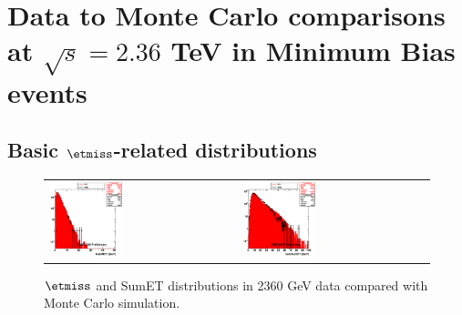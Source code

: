 \section{Data to Monte Carlo comparisons at $\sqrt{s}=2.36$ TeV in
  Minimum Bias events}
\label{sc:DataVsMCMB2360}

\subsection{Basic $\etmiss$-related distributions}
\begin{figure}[h!]
 \centering
 \begin{tabular}{ll}
  \includegraphics[width=0.40\textwidth]{plots_DataVsMC_MB_2360GeV/h_calometPt.eps} &
  \includegraphics[width=0.40\textwidth]{plots_DataVsMC_MB_2360GeV/h_caloSumet.eps} \\
 \end{tabular}
 \caption{$\etmiss$ and SumET distributions in 2360 GeV data compared with Monte Carlo simulation.
          \label{fig:DataVsMC_MB_2360_1}}
\end{figure}

